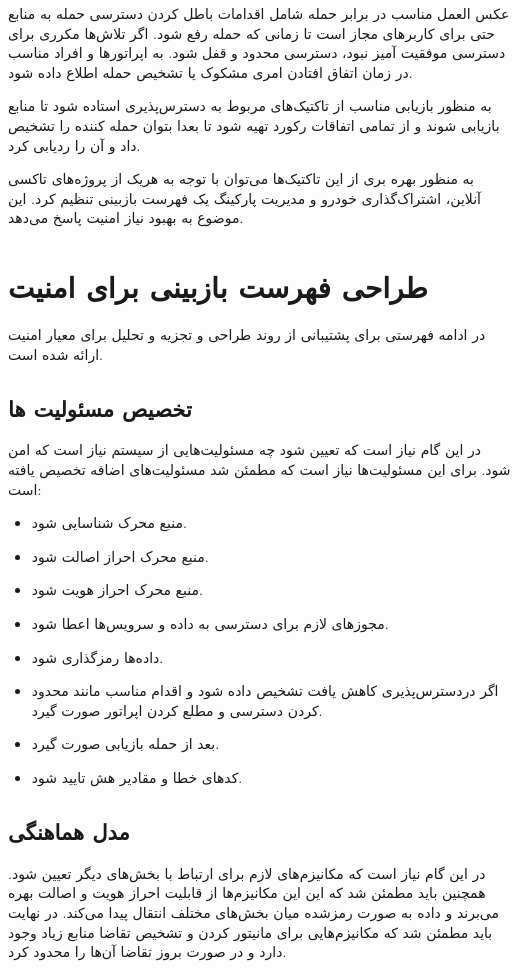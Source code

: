 عکس العمل مناسب در برابر حمله شامل اقدامات باطل کردن دسترسی حمله به منابع حتی برای کاربرهای مجاز است تا زمانی که حمله رفع شود. 
اگر تلاش‌ها مکرری برای دسترسی موفقیت آمیز نبود، دسترسی محدود و قفل شود. به اپراتورها و افراد مناسب در زمان اتفاق افتادن امری مشکوک یا تشخیص حمله اطلاع داده شود.

به منظور بازیابی مناسب از تاکتیک‌های مربوط به دسترس‌پذیری استاده شود تا  منابع بازیابی شوند و از تمامی اتفاقات رکورد تهیه شود تا بعدا بتوان حمله کننده را تشخیص داد و آن را ردیابی کرد.

به منظور بهره بری از این تاکتیک‌ها می‌توان با توجه به هریک از پروژه‌های تاکسی آنلاین، اشتراک‌گذاری خودرو و مدیریت پارکینگ یک فهرست بازبینی تنظیم کرد. این موضوع به بهبود نیاز امنیت پاسخ می‌دهد.

\section{طراحی فهرست بازبینی برای امنیت}

در ادامه فهرستی برای پشتیبانی از روند طراحی و تجزیه و تحلیل برای معیار امنیت ارائه شده است.


\subsection{تخصیص مسئولیت ها} 
در این گام نیاز است که تعیین شود چه مسئولیت‌هایی از سیستم نیاز است که امن شود. برای این مسئولیت‌ها نیاز است که مطمئن شد مسئولیت‌های اضافه تخصیص یافته است:
\begin{itemize}
\item
منبع محرک شناسایی شود.
\item
منبع محرک احراز اصالت شود.
\item
منبع محرک احراز هویت شود.
\item
مجوز‌های لازم برای دسترسی به داده و سرویس‌ها اعطا شود.
\item
داده‌ها رمزگذاری شود.
\item 
اگر دردسترس‌پذیری کاهش یافت تشخیص داده شود و اقدام مناسب مانند محدود کردن دسترسی و مطلع کردن اپراتور صورت گیرد.
\item
بعد از حمله بازیابی صورت گیرد.
\item
کدهای خطا و مقادیر هش تایید شود.
\end{itemize}
\subsection{مدل هماهنگی}
در این گام نیاز است که مکانیزم‌های لازم برای ارتباط با بخش‌های دیگر تعیین شود. همچنین باید مطمئن شد که این این مکانیزم‌ها از قابلیت احراز هویت و اصالت بهره می‌برند و داده به صورت رمزشده میان بخش‌های مختلف انتقال پیدا می‌کند.
در نهایت باید مطمئن شد که مکانیزم‌هایی برای مانیتور کردن و تشخیص تقاضا منابع زیاد وجود دارد و در صورت بروز تقاضا آن‌ها را محدود کرد.

